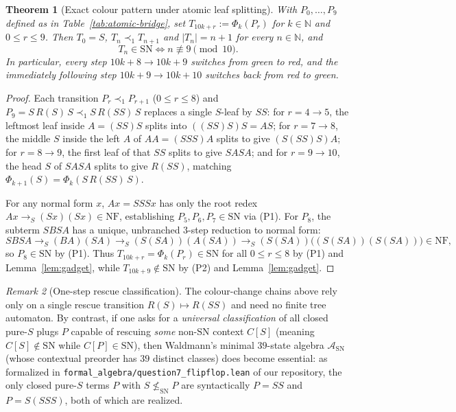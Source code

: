 \documentclass[11pt,reqno]{amsart}
\newtheorem{theorem}{Theorem}[section]
\theoremstyle{definition}
\theoremstyle{remark}
\newtheorem{remark}[theorem]{Remark}
\newcommand{\SN}{\mathrm{SN}}
\newcommand{\NF}{\mathrm{NF}}
\newcommand{\toS}{\to_S}
\begin{document}
\begin{theorem}[Exact colour pattern under atomic leaf splitting]\label{thm:q7-atomic}
With $P_0, \dots, P_9$ defined as in Table~\ref{tab:atomic-bridge}, set $T_{10k + r} := \Phi_k(P_r)$ for $k \in \mathbb{N}$ and $0 \le r \le 9$. Then $T_0 = S$, $T_n \prec_1 T_{n+1}$ and $|T_n| = n + 1$ for every $n \in \mathbb{N}$, and
\[
  T_n \in \SN \iff n \not\equiv 9 \pmod{10}.
\]
In particular, every step $10k + 8 \to 10k + 9$ switches from green to red, and the immediately following step $10k + 9 \to 10k + 10$ switches back from red to green.
\end{theorem}

\begin{proof}
Each transition $P_r \prec_1 P_{r+1}$ ($0 \le r \le 8$) and $P_9 = S\,R(S)\,S \prec_1 S\,R(S S)\,S$ replaces a single $S$-leaf by $S S$: for $r = 4 \to 5$, the leftmost leaf inside $A = (S S) S$ splits into $((S S) S) S = A S$; for $r = 7 \to 8$, the middle $S$ inside the left $A$ of $A A = (S S S) A$ splits to give $(S (S S) S) A$; for $r = 8 \to 9$, the first leaf of that $S S$ splits to give $S A S A$; and for $r = 9 \to 10$, the head $S$ of $S A S A$ splits to give $R(S S)$, matching $\Phi_{k+1}(S) = \Phi_k(S\,R(S S)\,S)$.

For any normal form $x$, $A x = S S S x$ has only the root redex $A x \toS (S x)(S x) \in \NF$, establishing $P_5, P_6, P_7 \in \SN$ via (P1). For $P_8$, the subterm $S B S A$ has a unique, unbranched $3$-step reduction to normal form:
\[
  S B S A \toS (B A)(S A) \toS (S (S A))(A (S A)) \toS (S (S A))\bigl((S (S A))(S (S A))\bigr) \in \NF,
\]
so $P_8 \in \SN$ by (P1). Thus $T_{10k + r} = \Phi_k(P_r) \in \SN$ for all $0 \le r \le 8$ by (P1) and Lemma~\ref{lem:gadget}, while $T_{10k + 9} \notin \SN$ by (P2) and Lemma~\ref{lem:gadget}.
\end{proof}

\begin{remark}[One-step rescue classification]\label{rem:rescue}
The colour-change chains above rely only on a single rescue transition $R(S) \mapsto R(S S)$ and need no finite tree automaton. By contrast, if one asks for a \emph{universal classification} of all closed pure-$S$ plugs $P$ capable of rescuing \emph{some} non-$\SN$ context $C[S]$ (meaning $C[S] \notin \SN$ while $C[P] \in \SN$), then Waldmann's minimal $39$-state algebra $\mathcal{A}_{\SN}$~\cite{Waldmann2000} (whose contextual preorder has $39$ distinct classes) does become essential: as formalized in \texttt{formal\_algebra/question7\_flipflop.lean} of our repository, the only closed pure-$S$ terms $P$ with $S \not\le_{\SN} P$ are syntactically $P = S S$ and $P = S(S S S)$, both of which are realized.
\end{remark}
\end{document}
